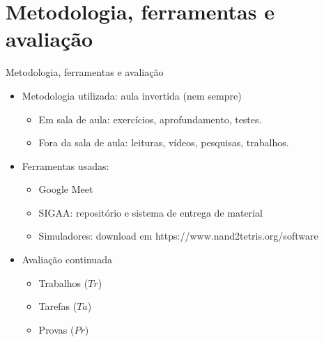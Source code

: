     \section[ slide = true]{Metodologia, ferramentas e avaliação}
      \begin{slide}[toc=]{Metodologia, ferramentas e avaliação}
         \begin{itemize}
		 \item Metodologia utilizada: aula invertida (nem sempre) 
		    \begin{itemize}
			    \item Em sala de aula: exercícios, aprofundamento, testes.
			    \item Fora da sala de aula: leituras, vídeos, pesquisas, trabalhos. 
		    \end{itemize}
	    \item Ferramentas usadas:
		    \begin{itemize}
			    \item Google Meet %
			    \item SIGAA: repositório e sistema de entrega de material
			    \item Simuladores: download em https://www.nand2tetris.org/software
		    \end{itemize}

            \item Avaliação continuada
            \begin{itemize}
		    \item Trabalhos ($Tr$) 
		    \item Tarefas ($Ta$)
		    \item Provas ($Pr$)
	    \end{itemize}
	 \end{itemize}
      \end{slide}
      
